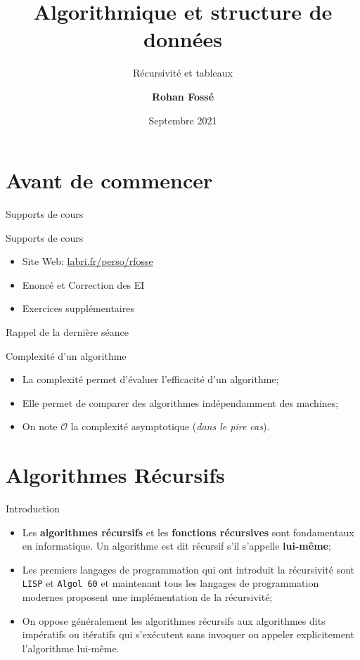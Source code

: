 \documentclass[10pt,xcolor=dvipsnames]{beamer}
\title{
Algorithmique et structure de données
}
\subtitle{Récursivité et tableaux}
\date{\centering 30 Septembre 2021}
\author{\centering \bf Rohan Fossé}
\begin{document}
\maketitle


\section{Avant de commencer}

\begin{frame}{Supports de cours}
    \begin{alertblock}{Supports de cours}
    \begin{itemize}
        \item Site Web: \underline{labri.fr/perso/rfosse}
        \item Enoncé et Correction des EI
        \item Exercices supplémentaires
    \end{itemize}
    \end{alertblock}
\end{frame}

\begin{frame}{Rappel de la dernière séance}
    \begin{alertblock}{Complexité d'un algorithme}
    \begin{itemize}
        \item La complexité permet d'évaluer l'efficacité d'un algorithme;
        \item Elle permet de comparer des algorithmes indépendamment des machines;
        \item On note $\mathcal{O}$ la complexité asymptotique (\textit{dans le pire cas}).
    \end{itemize}
    \end{alertblock}
\end{frame}

\section{Algorithmes Récursifs}


\begin{frame}{Introduction}
    \begin{itemize}
        \item Les \alert{\textbf{algorithmes récursifs}} et les \alert{\textbf{fonctions récursives}} sont fondamentaux en informatique. Un algorithme est dit récursif s'il s'appelle \textbf{lui-même};
        \item Les premiers langages de programmation qui ont introduit la récursivité sont \texttt{LISP} et \texttt{Algol 60} et maintenant tous les langages de programmation modernes proposent une implémentation de la récursivité;
        \item On oppose généralement les algorithmes récursifs aux algorithmes dits \alert{impératifs} ou \alert{itératifs} qui s'exécutent sans invoquer ou appeler explicitement l'algorithme lui-même.
    \end{itemize}
\end{frame}
\end{document}
